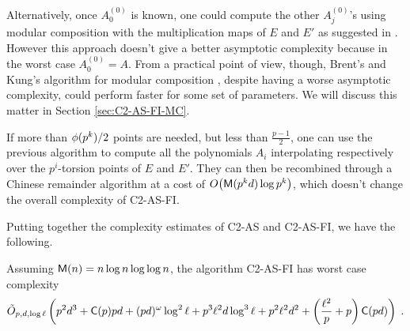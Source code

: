Alternatively, once $A_0^{(0)}$ is known, one could compute the other
$A_j^{(0)}$'s using modular composition with the multiplication maps
of $E$ and $E'$ as suggested in \cite{Cou96}. However this approach
doesn't give a better asymptotic complexity because in the worst case
$A_0^{(0)}=A$. From a practical point of view, though, Brent's and
Kung's algorithm for modular composition \cite{BrKu78}, despite having
a worse asymptotic complexity, could perform faster for some set of
parameters. We will discuss this matter in Section
\ref{sec:C2-AS-FI-MC}.

If more than $\phi(p^k)/2$ points are needed, but less than
$\frac{p-1}{2}$, one can use the previous algorithm to compute all the
polynomials $A_i$ interpolating respectively over the $p^i$-torsion
points of $E$ and $E'$. They can then be recombined through a Chinese
remainder algorithm at a cost of $O\bigl(\mathrm{\sf M}(p^kd)\log p^k\bigr)$,
which doesn't change the overall complexity of C2-AS-FI.


Putting together the complexity estimates of C2-AS and C2-AS-FI, we
have the following.

\begin{theorem}
  \label{th:complexity}
  Assuming $\mathrm{\sf M}(n) = n\log n\log\log n$, the algorithm C2-AS-FI has
  worst case complexity
  \begin{equation*}
    \tilde{O}_{p,d,\log\ell}\left(
      p^2d^3 +
      \mathrm{\sf C}(p)pd +
      (pd)^\omega\log^2\ell +
      p^3\ell^2 d\log^3\ell + 
      p^2\ell^2 d^2+
      \left(\frac{\ell^2}{p} + p\right)\mathrm{\sf C}(pd)
    \right)
    \;\text{.}
  \end{equation*}
\end{theorem}



%
